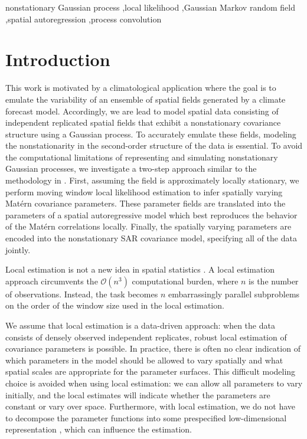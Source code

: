 \documentclass[review]{elsarticle}
\begin{document}
\begin{frontmatter}
\begin{abstract}
\end{abstract}

\begin{keyword}
nonstationary Gaussian process \sep local likelihood \sep Gaussian Markov random field \sep spatial autoregression \sep process convolution
\end{keyword}

\end{frontmatter}

\linenumbers

\section{Introduction}

This work is motivated by a climatological application where the goal is to emulate the variability of an ensemble of spatial fields generated by a climate forecast model. Accordingly, we are lead to model spatial data consisting of independent replicated spatial fields that exhibit a nonstationary covariance structure using a Gaussian process. To accurately emulate these fields, modeling the nonstationarity in the second-order structure of the data is essential. 
To avoid the computational limitations of representing and simulating nonstationary Gaussian processes, we investigate a two-step approach similar to the methodology in \cite{nychka2018modeling}. First, assuming the field is approximately locally stationary, we perform moving window local likelihood estimation to infer spatially varying Mat\'ern covariance parameters. These parameter fields are translated into the parameters of a spatial autoregressive model which best reproduces the behavior of the Mat\'ern correlations locally. Finally, the spatially varying parameters are encoded into the nonstationary SAR covariance model, specifying all of the data jointly.

Local estimation is not a new idea in spatial statistics \cite{haas1990kriging, haas1990lognormal, ver2004flexible, risser2015local}. A local estimation approach circumvents the $\mathcal{O}(n^3)$ computational burden, where $n$ is the number of observations. Instead, the task becomes $n$ embarrassingly parallel subproblems on the order of the window size used in the local estimation. 

We assume that local estimation is a data-driven approach: when the data consists of densely observed independent replicates, robust local estimation of covariance parameters is possible. In practice, there is often no clear indication of which parameters in the model should be allowed to vary spatially \cite{fuglstad2015does} and what spatial scales are appropriate for the parameter surfaces. This difficult modeling choice is avoided when using local estimation: we can allow all parameters to vary initially, and the local estimates will indicate whether the parameters are constant or vary over space. Furthermore, with local estimation, we do not have to decompose the parameter functions into some prespecified low-dimensional representation \cite{fuglstad2015exploring, risser2016nonstationary}, which can influence the estimation. 
\end{document}
